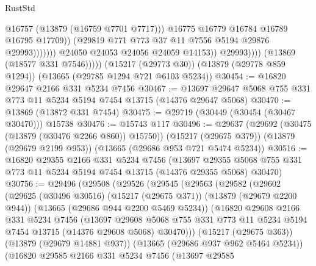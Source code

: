 \begin{lexlean}{RustStd}
\begin{coremodule}
                                        @16757
                                        (@13879 (@16759 @7701 @7717)))
                                      @16775
                                      @16779
                                      @16784
                                      @16789
                                      @16795
                                      @17709))
                                  (@29819 @771 @773 @37 @11 @7556 @5194 @29876 @29993)))))))
                      @24050
                      @24053
                      @24056
                      @24059
                      @14153))
                  @29993))))
          (@13869 (@18577 @331 @7546)))))
    (@15217 (@29773 @30))
    (@13879 (@29778 @859 @1294))
    (@13665 (@29785 @1294 @721 @6103 @5234))
@30454 := @16820 @29647 @2166 @331 @5234 @7456
@30467 := @13697 @29647 @5068 @755 @331 @773 @11 @5234 @5194 @7454 @13715 (@14376 @29647 @5068)
@30470 := @13869 (@13872 @331 @7454)
@30475 := @29719 (@30449 (@30454 (@30467 @30470))) @15738
@30476 := @15743 @117
@30496 := @29637
    (@29692 (@30475 (@13879 (@30476 @2266 @860)) @15750))
    (@15217 (@29675 @379))
    (@13879 (@29679 @2199 @953))
    (@13665 (@29686 @953 @721 @5474 @5234))
@30516 := @16820
    @29355
    @2166
    @331
    @5234
    @7456
    (@13697 @29355 @5068 @755 @331 @773 @11 @5234 @5194 @7454 @13715 (@14376 @29355 @5068) @30470)
@30756 := @29496
    (@29508
      (@29526
        (@29545
          (@29563
            (@29582
              (@29602
                (@29625
                  (@30496 @30516)
                  (@15217 (@29675 @371))
                  (@13879 (@29679 @2200 @944))
                  (@13665 (@29686 @944 @2200 @5469 @5234))
                  (@16820
                    @29608
                    @2166
                    @331
                    @5234
                    @7456
                    (@13697
                      @29608
                      @5068
                      @755
                      @331
                      @773
                      @11
                      @5234
                      @5194
                      @7454
                      @13715
                      (@14376 @29608 @5068)
                      @30470)))
                (@15217 (@29675 @363))
                (@13879 (@29679 @14881 @937))
                (@13665 (@29686 @937 @962 @5464 @5234))
                (@16820
                  @29585
                  @2166
                  @331
                  @5234
                  @7456
                  (@13697
                    @29585

\end{coremodule}
\end{lexlean}
